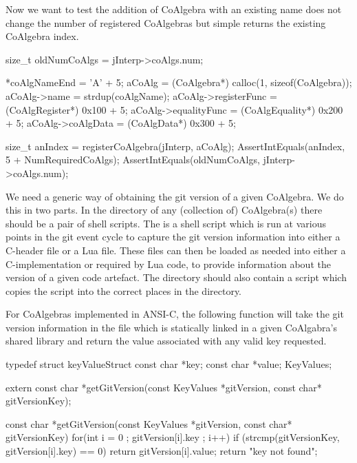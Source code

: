 Now we want to test the addition of CoAlgebra with an existing name does 
not change the number of registered CoAlgebras but simple returns the 
existing CoAlgebra index. 

\startCTest
  size_t oldNumCoAlgs  = jInterp->coAlgs.num;

  *coAlgNameEnd        = 'A' + 5;
  aCoAlg               = (CoAlgebra*) calloc(1, sizeof(CoAlgebra));
  aCoAlg->name         = strdup(coAlgName);
  aCoAlg->registerFunc = (CoAlgRegister*) 0x100 + 5;
  aCoAlg->equalityFunc = (CoAlgEquality*) 0x200 + 5;
  aCoAlg->coAlgData    = (CoAlgData*)     0x300 + 5;
  
  size_t anIndex = registerCoAlgebra(jInterp, aCoAlg);
  AssertIntEquals(anIndex, 5 + NumRequiredCoAlgs);
  AssertIntEquals(oldNumCoAlgs, jInterp->coAlgs.num);
\stopCTest
\stopTestCase
\stopTestSuite

\startTestSuite[getGitVersion]

We need a generic way of obtaining the git version of a given CoAlgebra. 
We do this in two parts. In the  directory of any (collection 
of) CoAlgebra(s) there should be a pair of shell scripts. The 
 is a  shell script which is run at various 
points in the git event cycle to capture the git version information into 
either a C-header file or a Lua file. These files can then be loaded as 
needed into either a C-implementation or required by Lua code, to provide 
information about the version of a given code artefact. The  
directory should also contain a   script 
which copies the  script into the correct places in the 
 directory. 

For CoAlgebras implemented in ANSI-C, the following function will take the 
git version information in the  file which is 
statically linked in a given CoAlgabra's shared library and return the 
value associated with any valid key requested. 

\startCHeader
typedef struct keyValueStruct {
  const char *key;
  const char *value;
} KeyValues;

extern const char *getGitVersion(const KeyValues *gitVersion, 
                                 const char* gitVersionKey);
\stopCHeader

\startCCode
const char *getGitVersion(const KeyValues *gitVersion,
                          const char* gitVersionKey) {
  for(int i = 0 ; gitVersion[i].key ; i++) {
    if (strcmp(gitVersionKey, gitVersion[i].key) == 0) {
      return gitVersion[i].value;
    }
  }
  return "key not found";
}
\stopCCode

